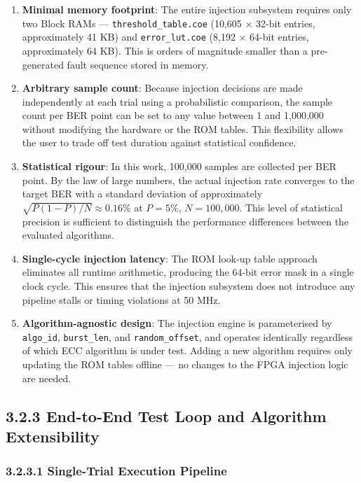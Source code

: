 \documentclass[
  12pt,
  a4paper]{report}
\begin{document}
\begin{enumerate}
\def\labelenumi{\arabic{enumi}.}
\item
  \textbf{Minimal memory footprint}: The entire injection subsystem
  requires only two Block RAMs --- \texttt{threshold\_table.coe} (10,605
  × 32-bit entries, approximately 41 KB) and \texttt{error\_lut.coe}
  (8,192 × 64-bit entries, approximately 64 KB). This is orders of
  magnitude smaller than a pre-generated fault sequence stored in
  memory.
\item
  \textbf{Arbitrary sample count}: Because injection decisions are made
  independently at each trial using a probabilistic comparison, the
  sample count per BER point can be set to any value between 1 and
  1,000,000 without modifying the hardware or the ROM tables. This
  flexibility allows the user to trade off test duration against
  statistical confidence.
\item
  \textbf{Statistical rigour}: In this work, 100,000 samples are
  collected per BER point. By the law of large numbers, the actual
  injection rate converges to the target BER with a standard deviation
  of approximately \(\sqrt{P(1-P)/N} \approx 0.16\%\) at \(P = 5\%\),
  \(N = 100{,}000\). This level of statistical precision is sufficient
  to distinguish the performance differences between the evaluated
  algorithms.
\item
  \textbf{Single-cycle injection latency}: The ROM look-up table
  approach eliminates all runtime arithmetic, producing the 64-bit error
  mask in a single clock cycle. This ensures that the injection
  subsystem does not introduce any pipeline stalls or timing violations
  at 50 MHz.
\item
  \textbf{Algorithm-agnostic design}: The injection engine is
  parameterised by \texttt{algo\_id}, \texttt{burst\_len}, and
  \texttt{random\_offset}, and operates identically regardless of which
  ECC algorithm is under test. Adding a new algorithm requires only
  updating the ROM tables offline --- no changes to the FPGA injection
  logic are needed.
\end{enumerate}

\subsection{3.2.3 End-to-End Test Loop and Algorithm
Extensibility}\label{end-to-end-test-loop-and-algorithm-extensibility}

\subsubsection{3.2.3.1 Single-Trial Execution
Pipeline}\label{single-trial-execution-pipeline}
\end{document}
